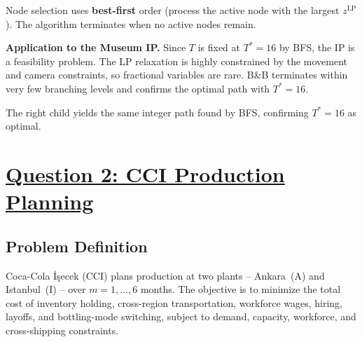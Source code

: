 \documentclass[12pt,a4paper]{article}
\begin{document}
Node selection uses \textbf{best-first} order (process the active node with the largest
$z^{\mathrm{LP}}$). The algorithm terminates when no active nodes remain.

\textbf{Application to the Museum IP.}
Since $T$ is fixed at $T^*=16$ by BFS, the IP is a feasibility problem. The LP relaxation
is highly constrained by the movement and camera constraints, so fractional variables are
rare. B\&B terminates within very few branching levels and confirms the optimal path with
$T^*=16$.

\medskip
\begin{center}
\end{center}

\medskip
The right child yields the same integer path found by BFS, confirming $T^*=16$ as optimal.

\newpage

\section*{\underline{Question 2: CCI Production Planning}}

\subsection*{Problem Definition}

Coca-Cola \.{I}\c{s}ecek (CCI) plans production at two plants -- Ankara~(A) and
Istanbul~(I) -- over $m=1,\ldots,6$ months. The objective is to minimize the total cost of
inventory holding, cross-region transportation, workforce wages, hiring, layoffs, and
bottling-mode switching, subject to demand, capacity, workforce, and cross-shipping
constraints.
\end{document}
